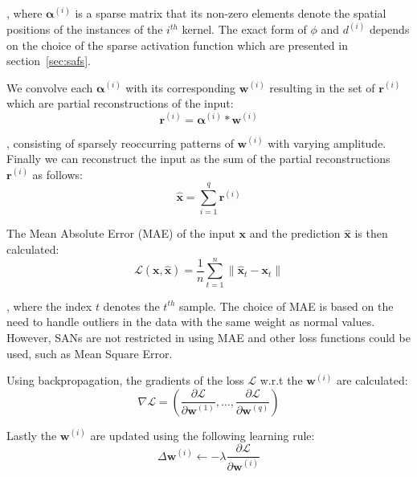 \documentclass[journal]{IEEEtran}
\begin{document}
\noindent
, where $\bm{\alpha}^{(i)}$ is a sparse matrix that its non-zero elements denote the spatial positions of the instances of the $i^{th}$ kernel.
The exact form of $\phi$ and $d^{(i)}$ depends on the choice of the sparse activation function which are presented in section~\ref{sec:safs}.

We convolve each $\bm{\alpha}^{(i)}$ with its corresponding $\bm{w}^{(i)}$ resulting in the set of $\bm{r}^{(i)}$ which are partial reconstructions of the input:
\begin{equation}
	\label{eq:reconstructions}
	\bm{r}^{(i)} = \bm{\alpha}^{(i)} * \bm{w}^{(i)}
\end{equation}

\noindent
, consisting of sparsely reoccurring patterns of $\bm{w}^{(i)}$ with varying amplitude.
Finally we can reconstruct the input as the sum of the partial reconstructions $\bm{r}^{(i)}$ as follows:
\begin{equation}
	\label{eq:output1}
	\hat{\bm{x}} = \sum\limits_{i=1}^q \bm{r}^{(i)}
\end{equation}

The Mean Absolute Error (MAE) of the input $\bm{x}$ and the prediction $\hat{\bm{x}}$ is then calculated:
\begin{equation}
	\label{eq:lossfunction}
	\mathcal{L}\left( {\bm{x},\hat{\bm{x}}} \right) = \frac{1}{n}\sum\limits_{t=1}^n \Big\lVert\hat{\bm{x}}_t - \bm{x}_t \Big\rVert
\end{equation}

\noindent
, where the index $t$ denotes the $t^{th}$ sample.
The choice of MAE is based on the need to handle outliers in the data with the same weight as normal values.
However, SANs are not restricted in using MAE and other loss functions could be used, such as Mean Square Error.

Using backpropagation, the gradients of the loss $\mathcal{L}$ w.r.t the $\bm{w}^{(i)}$ are calculated:
\begin{equation}
	\label{eq:backpropagation1}
	\nabla\mathcal{L} = \left( \frac{\partial\mathcal{L}}{\partial\bm{w}^{(1)}},\ldots,\frac{\partial\mathcal{L}}{\partial\bm{w}^{(q)}}\right)
\end{equation}

Lastly the $\bm{w}^{(i)}$ are updated using the following learning rule:
\begin{equation}
	\label{eq:backpropagation2}
	\Delta\bm{w}^{(i)} \leftarrow -\lambda\frac{\partial\mathcal{L}}{\partial\bm{w}^{(i)}}
\end{equation}
\end{document}
